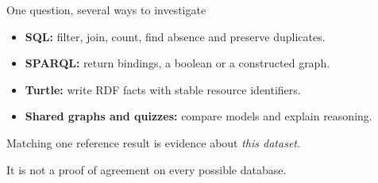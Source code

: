 \begin{frame}[t]{One question, several ways to investigate}
\begin{itemize}
\item \textbf{SQL:} filter, join, count, find absence and preserve duplicates.
\item \textbf{SPARQL:} return bindings, a boolean or a constructed graph.
\item \textbf{Turtle:} write RDF facts with stable resource identifiers.
\item \textbf{Shared graphs and quizzes:} compare models and explain reasoning.
\end{itemize}\vspace{4mm}
Matching one reference result is evidence about \emph{this dataset}.\par
It is not a proof of agreement on every possible database.
\end{frame}
